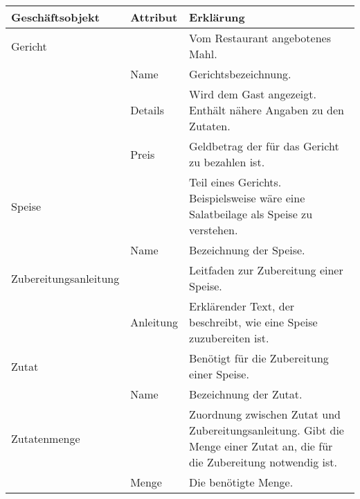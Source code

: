 \begin{tabu} to \linewidth {X|X|X}
\hline
{}
Gesch\"aftsobjekt &Attribut &Erkl\"arung \\
\hline
Gericht & &Vom Restaurant angebotenes Mahl. \\
  \hline
  &Name &Gerichtsbezeichnung. \\
  \hline
  &Details &Wird dem Gast angezeigt. Enth\"alt n\"ahere Angaben zu den Zutaten. \\
  \hline
  &Preis &Geldbetrag der f\"ur das Gericht zu bezahlen ist. \\
\hline
Speise & &Teil eines Gerichts. Beispielsweise w\"are eine Salatbeilage als Speise zu verstehen. \\
  \hline
  &Name &Bezeichnung der Speise. \\
\hline
Zubereitungsanleitung & &Leitfaden zur Zubereitung einer Speise. \\
  \hline
  &Anleitung &Erkl\"arender Text, der beschreibt, wie eine Speise zuzubereiten ist. \\
\hline
Zutat & &Ben\"otigt f\"ur die Zubereitung einer Speise. \\
  \hline
  &Name &Bezeichnung der Zutat. \\
\hline
Zutatenmenge & &Zuordnung zwischen Zutat und Zubereitungsanleitung.
                 Gibt die Menge einer Zutat an, die f\"ur die Zubereitung notwendig ist. \\
  \hline
  &Menge &Die ben\"otigte Menge. \\
\hline
\end{tabu}
